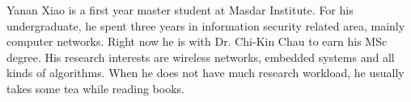 \documentclass[12pt,journal,compsoc]{IEEEtran}
\begin{document}




%



%




\begin{IEEEbiographynophoto}{Yanan Xiao}
is a first year master student at Masdar Institute. For his undergraduate, he spent three years in information security related area, mainly computer networks. Right now he is with Dr. Chi-Kin Chau to earn his MSc degree. His research interests are wireless networks, embedded systems and all kinds of algorithms. When he does not have much research workload, he usually takes some tea while reading books.
\end{IEEEbiographynophoto}
\end{document}
